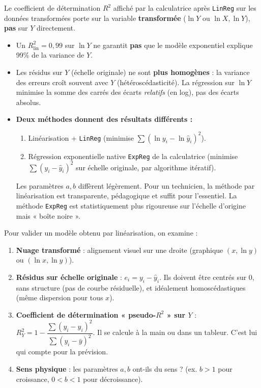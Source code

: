 \documentclass[11pt]{article}
\begin{document}
\begin{attention}
Le coefficient de détermination $R^2$ affiché par la calculatrice après \texttt{LinReg} sur les données transformées porte sur la variable \textbf{transformée} ($\ln Y$ ou $\ln X, \ln Y$), \textbf{pas} sur $Y$ directement.
\begin{itemize}
  \item Un $R^2_{\text{lin}} = 0,99$ sur $\ln Y$ ne garantit \textbf{pas} que le modèle exponentiel explique 99\% de la variance de $Y$.
  \item Les résidus sur $Y$ (échelle originale) ne sont \textbf{plus homogènes} : la variance des erreurs croît souvent avec $Y$ (hétéroscédasticité). La régression sur $\ln Y$ minimise la somme des carrés des écarts \emph{relatifs} (en log), pas des écarts absolus.
  \item \textbf{Deux méthodes donnent des résultats différents :}
  \begin{enumerate}
    \item Linéarisation + \texttt{LinReg} (minimise $\sum (\ln y_i - \ln \hat{y}_i)^2$).
    \item Régression exponentielle native \texttt{ExpReg} de la calculatrice (minimise $\sum (y_i - \hat{y}_i)^2$ sur échelle originale, par algorithme itératif).
  \end{enumerate}
  Les paramètres $a, b$ diffèrent légèrement. Pour un technicien, la méthode par linéarisation est transparente, pédagogique et suffit pour l'essentiel. La méthode \texttt{ExpReg} est statistiquement plus rigoureuse sur l'échelle d'origine mais « boîte noire ».
\end{itemize}
\end{attention}

\begin{propriete}
Pour valider un modèle obtenu par linéarisation, on examine :
\begin{enumerate}
  \item \textbf{Nuage transformé} : alignement visuel sur une droite (graphique $(x, \ln y)$ ou $(\ln x, \ln y)$).
  \item \textbf{Résidus sur échelle originale} : $e_i = y_i - \hat{y}_i$. Ils doivent être centrés sur 0, sans structure (pas de courbe résiduelle), et idéalement homoscédastiques (même dispersion pour tous $x$).
  \item \textbf{Coefficient de détermination « pseudo-$R^2$ » sur $Y$} : $R^2_Y = 1 - \dfrac{\sum (y_i - \hat{y}_i)^2}{\sum (y_i - \bar{y})^2}$. Il se calcule à la main ou dans un tableur. C'est lui qui compte pour la prévision.
  \item \textbf{Sens physique} : les paramètres $a, b$ ont-ils du sens ? (ex. $b>1$ pour croissance, $0<b<1$ pour décroissance).
\end{enumerate}
\end{propriete}
\end{document}
